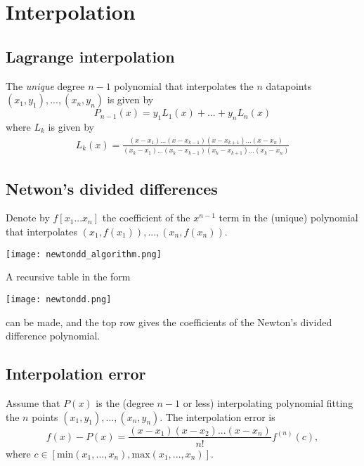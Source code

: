 \section{Interpolation}
\subsection{Lagrange interpolation}
The \textit{unique} degree $n-1$ polynomial that interpolates the $n$ datapoints $(x_1, y_1), ..., (x_n, y_n)$ is given by
$$
P_{n-1}(x) = y_1L_1(x) + ... + y_nL_n(x)
$$
where $L_k$ is given by
\begin{gather*}
L_k(x) = \frac{(x-x_1)...(x-x_{k-1})(x-x_{k+1})...(x-x_n)}{(x_k-x_1)...(x_k - x_{k-1})(x_k - x_{k+1})...(x_k-x_n)}
\end{gather*}

\subsection{Netwon's divided differences}
\begin{definition}
Denote by $f[x_1...x_n]$ the coefficient of the $x^{n-1}$ term in the (unique) polynomial that interpolates $(x_1, f(x_1)), ..., (x_n,f(x_n))$.
\end{definition}

\begin{center}
\texttt{[image: newtondd\_algorithm.png]}
\end{center}

A recursive table in the form
\begin{center}
\texttt{[image: newtondd.png]}
\end{center}
can be made, and the top row gives the coefficients of the Newton's divided difference polynomial.

\subsection{Interpolation error}
\begin{theorem}
Assume that $P(x)$ is the (degree $n-1$ or less) interpolating polynomial fitting the $n$ points $(x_1,y_1),...,(x_n,y_n)$. The interpolation error is
$$
f(x)-P(x) = \frac{(x-x_1)(x-x_2)...(x-x_n)}{n!}f^{(n)}(c),
$$
where $c \in [\text{min}(x_1,...,x_n), \text{max}(x_1,...,x_n)]$.
\end{theorem}

